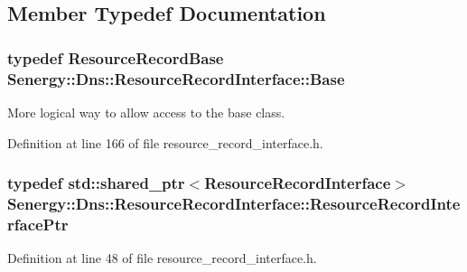 \subsection{Member Typedef Documentation}
\hypertarget{class_senergy_1_1_dns_1_1_resource_record_interface_a59bcfc62cfc3a68464245b13ad3785e6}{
\subsubsection[{Base}]{\setlength{\rightskip}{0pt plus 5cm}typedef {\bf Resource\-Record\-Base} {\bf Senergy\-::\-Dns\-::\-Resource\-Record\-Interface\-::\-Base}\hspace{0.3cm}{\ttfamily [protected]}}}\label{class_senergy_1_1_dns_1_1_resource_record_interface_a59bcfc62cfc3a68464245b13ad3785e6}


More logical way to allow access to the base class. 



Definition at line 166 of file resource\-\_\-record\-\_\-interface.\-h.

\hypertarget{class_senergy_1_1_dns_1_1_resource_record_interface_abf5eec20c95f05b57c5c02eaed349e16}{
\subsubsection[{Resource\-Record\-Interface\-Ptr}]{\setlength{\rightskip}{0pt plus 5cm}typedef std\-::shared\-\_\-ptr$<${\bf Resource\-Record\-Interface}$>$ {\bf Senergy\-::\-Dns\-::\-Resource\-Record\-Interface\-::\-Resource\-Record\-Interface\-Ptr}\hspace{0.3cm}{\ttfamily [protected]}}}\label{class_senergy_1_1_dns_1_1_resource_record_interface_abf5eec20c95f05b57c5c02eaed349e16}


Definition at line 48 of file resource\-\_\-record\-\_\-interface.\-h.



